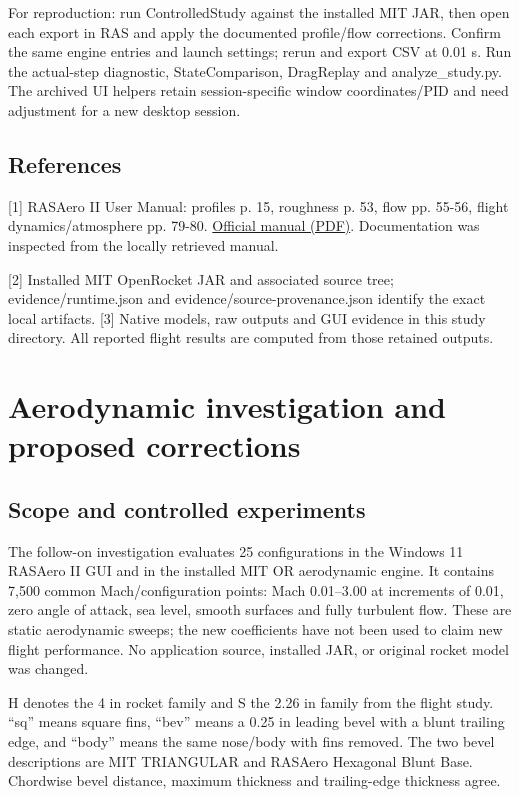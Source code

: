 \documentclass[oneside,openany]{amsdtx}
\begin{document}
For reproduction: run ControlledStudy against the installed MIT JAR, then open each export in RAS and apply the documented profile/flow corrections. Confirm the same engine entries and launch settings; rerun and export CSV at 0.01 s. Run the actual-step diagnostic, StateComparison, DragReplay and analyze\_study.py. The archived UI helpers retain session-specific window coordinates/PID and need adjustment for a new desktop session.


\subsection{References}

[1] RASAero II User Manual: profiles p. 15, roughness p. 53, flow pp. 55-56, flight dynamics/atmosphere pp. 79-80. \href{https://www.rasaero.com/dloads/RASAero\%20II\%20Users\%20Manual.pdf}{Official manual (PDF)}. Documentation was inspected from the locally retrieved manual.


[2] Installed MIT OpenRocket JAR and associated source tree; evidence/runtime.json and evidence/source-provenance.json identify the exact local artifacts. [3] Native models, raw outputs and GUI evidence in this study directory. All reported flight results are computed from those retained outputs.



\clearpage\section{Aerodynamic investigation and proposed corrections}\label{sec:aero}
\subsection{Scope and controlled experiments}
The follow-on investigation evaluates 25 configurations in the Windows 11 RASAero II GUI and in the installed MIT OR aerodynamic engine. It contains 7,500 common Mach/configuration points: Mach 0.01--3.00 at increments of 0.01, zero angle of attack, sea level, smooth surfaces and fully turbulent flow. These are static aerodynamic sweeps; the new coefficients have not been used to claim new flight performance. No application source, installed JAR, or original rocket model was changed.

H denotes the 4 in rocket family and S the 2.26 in family from the flight study. ``sq'' means square fins, ``bev'' means a 0.25 in leading bevel with a blunt trailing edge, and ``body'' means the same nose/body with fins removed. The two bevel descriptions are MIT TRIANGULAR and RASAero Hexagonal Blunt Base. Chordwise bevel distance, maximum thickness and trailing-edge thickness agree.
\end{document}
